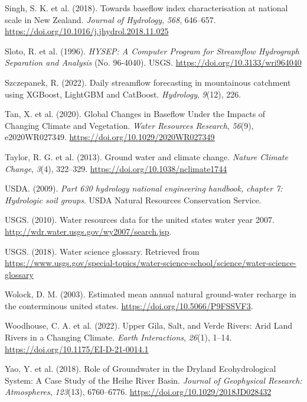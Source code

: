 \documentclass[
]{agujournal2019}
\newlength{\cslhangindent}
\newenvironment{CSLReferences}[2] %
 {\begin{list}{}{%
  \setlength{\itemindent}{0pt}
  \setlength{\leftmargin}{0pt}
  \setlength{\parsep}{0pt}
  \ifodd #1
   \setlength{\leftmargin}{\cslhangindent}
   \setlength{\itemindent}{-1\cslhangindent}
  \fi
  \setlength{\itemsep}{#2\baselineskip}}}
 {\end{list}}
\begin{document}
\begin{CSLReferences}{1}{0}
Singh, S. K. et al. (2018). Towards baseflow index characterisation at
national scale in New Zealand. \emph{Journal of Hydrology}, \emph{568},
646--657. \url{https://doi.org/10.1016/j.jhydrol.2018.11.025}

Sloto, R. et al. (1996). \emph{HYSEP: A Computer Program for Streamflow
Hydrograph Separation and Analysis} (No. 96-4040). {USGS}.
\url{https://doi.org/10.3133/wri964040}

Szczepanek, R. (2022). Daily streamflow forecasting in mountainous
catchment using XGBoost, LightGBM and CatBoost. \emph{Hydrology},
\emph{9}(12), 226.

Tan, X. et al. (2020). Global Changes in Baseflow Under the Impacts of
Changing Climate and Vegetation. \emph{Water Resources Research},
\emph{56}(9), e2020WR027349. \url{https://doi.org/10.1029/2020WR027349}

Taylor, R. G. et al. (2013). Ground water and climate change.
\emph{Nature Climate Change}, \emph{3}(4), 322--329.
\url{https://doi.org/10.1038/nclimate1744}

USDA. (2009). \emph{Part 630 hydrology national engineering handbook,
chapter 7: Hydrologic soil groups}. USDA Natural Resources Conservation
Service.

USGS. (2010). Water resources data for the united states water year
2007. \url{http://wdr.water.usgs.gov/wy2007/search.jsp}.

USGS. (2018). Water science glossary. Retrieved from
\url{https://www.usgs.gov/special-topics/water-science-school/science/water-science-glossary}

Wolock, D. M. (2003). Estimated mean annual natural ground-water
recharge in the conterminous united states.
\url{https://doi.org/10.5066/P9FSSVF3}.

Woodhouse, C. A. et al. (2022). Upper {Gila}, {Salt}, and {Verde
Rivers}: {Arid Land Rivers} in a {Changing Climate}. \emph{Earth
Interactions}, \emph{26}(1), 1--14.
\url{https://doi.org/10.1175/EI-D-21-0014.1}

Yao, Y. et al. (2018). Role of Groundwater in the Dryland
Ecohydrological System: A Case Study of the Heihe River Basin.
\emph{Journal of Geophysical Research: Atmospheres}, \emph{123}(13),
6760--6776. \url{https://doi.org/10.1029/2018JD028432}


\end{CSLReferences}
\end{document}
